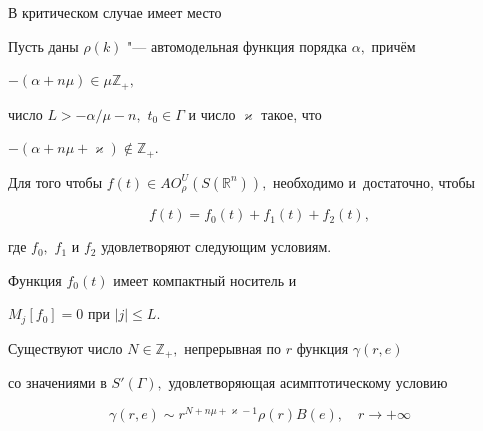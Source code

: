 В критическом случае имеет место 



\smallskip

\begin{theorem}[2] Пусть даны $\rho(k)$ "--- автомодельная функция порядка $\alpha, $  причём



$- (\alpha +n\mu) \in \mu \mathbb Z_{+},$


число $L>{-\alpha}/{\mu}-n,$ $t_0 \in \Gamma$ и число $\varkappa$ такое{\rm,} что



$-(\alpha +n\mu+\varkappa) \notin \mathbb Z_{+}.$


Для того чтобы $f(t)\in AO_{\rho}^{U}(S(\mathbb R^n)),$ необходимо и~достаточно{\rm,} чтобы

\begin{equation*}


f(t)=f_0(t)+f_1(t)+f_2(t),

\end{equation*}

где $f_0,$ $f_1$ и $f_2$ удовлетворяют следующим условиям.



Функция $f_0(t)$ имеет компактный носитель и


$M_{j}[f_0]= 0$ при $|j| \leq L.$




Существуют число $N\in \mathbb Z_{+},$ непрерывная по $r$ функция $\gamma (r,e)$

со значениями в $S'(\Gamma),$ удовлетворяющая асимптотическому условию

\begin{equation*}


\gamma (r,e) \sim r^{N+n\mu+\varkappa-1}\rho(r)B(e),\quad r\to +\infty


\end{equation*}
\end{theorem}
